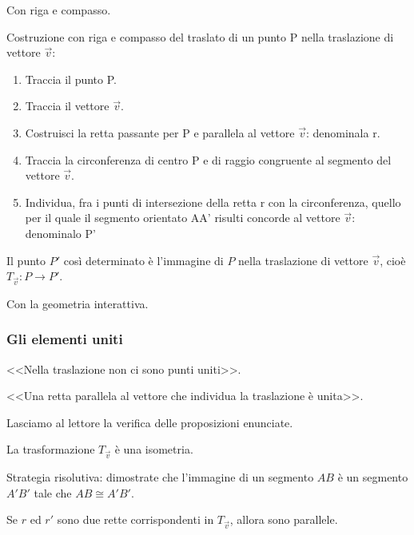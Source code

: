 Con riga e compasso.

\begin{procedura}
  Costruzione con riga e compasso del traslato di un punto P nella traslazione 
di vettore $\vec{v}$:
  \begin{enumerate} [nosep]
    \item 
    Traccia il punto P.
    \item 
    Traccia il vettore $\vec{v}$.
    \item 
    Costruisci la retta passante per P e parallela al vettore $\vec{v}$: 
denominala r.
    \item 
    Traccia la circonferenza di centro P e di raggio congruente al segmento del 
vettore $\vec{v}$.
    \item 
    Individua, fra i punti di intersezione della retta r con la circonferenza, 
quello per il quale il segmento orientato AA' risulti concorde al vettore 
$\vec{v}$: denominalo P' 
  \end{enumerate}
  Il punto $P'$ così determinato è l'immagine di $P$ nella traslazione di 
vettore $\vec{v}$, 
  cioè $T_{\vec{v}}:P\rightarrow P'$.
\end{procedura}

Con la geometria interattiva.


\subsubsection{Gli elementi uniti}

\begin{itemize*}
\item <<Nella traslazione non ci sono punti uniti>>.
\item <<Una retta parallela al vettore che individua la traslazione è 
unita>>.
\end{itemize*}

Lasciamo al lettore la verifica delle proposizioni enunciate.

\begin{teorema}
La trasformazione $T_{\vec{v}}$ è una isometria.
\end{teorema}

Strategia risolutiva: dimostrate che l'immagine di un segmento $AB$ è 
un segmento $A'B'$ tale che $AB\cong A'B'$.

\begin{teorema}
Se $r$ ed $r'$ sono due rette corrispondenti in $T_{\vec{v}}$, allora 
sono parallele.
\end{teorema}

